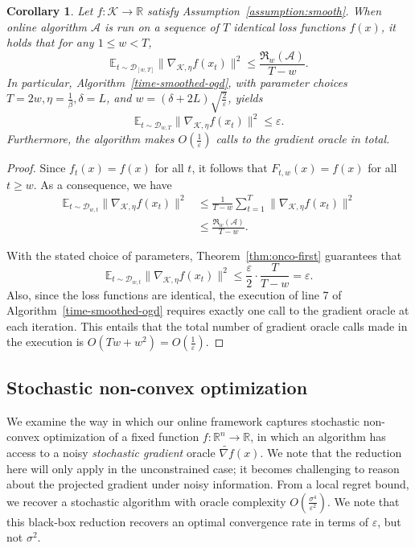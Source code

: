 \documentclass{article}
\def\reals{{\mathbb R}}
\def\reals{{\mathbb R}}
\newcommand{\K}{\ensuremath{\mathcal K}}
\def\eps{\varepsilon}
\newcommand{\pa}[1]{\left(#1\right)}
\newtheorem{corollary}[theorem]{Corollary}
\renewcommand{\K}{\mathcal{K}}
\newcommand{\Acal}{\mathcal{A}}
\newcommand{\regret}{\mathfrak{R}}
\begin{document}
\begin{corollary}
Let $f:\K\to\reals$ satisfy Assumption~\ref{assumption:smooth}. When online algorithm $\Acal$ is run on a sequence of $T$ identical loss functions $f(x)$, it holds that for any $1 \leq w < T$,
\begin{equation*}
\mathbb{E}_{t\sim \mathcal{D}_{[w,T]}} \|\nabla_{\K,\eta} f(x_t)\|^2  \leq  \frac{\regret_w(\Acal)}{T-w}.
\end{equation*}
In particular, Algorithm~\ref{time-smoothed-ogd}, with parameter choices $T=2w, \eta = \frac{1}{\beta}, \delta = L$, and $w=(\delta+2L)\sqrt{\frac{2}{\eps}}$, yields
\[ \mathbb{E}_{t\sim\mathcal{D}_{w,T}}\|\nabla_{\K,\eta} f(x_t)\|^2 \leq \eps.\]
Furthermore, the algorithm makes $O\left(\frac{1}{\eps}\right)$ calls to the gradient oracle in total.
\end{corollary}
\begin{proof}
Since $f_t(x) = f(x)$ for all $t$, it follows that $F_{t,w}(x)=f(x)$ for all $t \geq w$. As a consequence, we have
\begin{align*}
\mathbb{E}_{t\sim \mathcal{D}_{w,t}} \|\nabla_{\K,\eta} f(x_t)\|^2   &\leq \frac{1}{T-w} \sum_{t=1}^T \|\nabla_{\K,\eta} f(x_t)\|^2 \\
&\leq \frac{\regret_w(\Acal)}{T-w}.
\end{align*}

With the stated choice of parameters, Theorem~\ref{thm:onco-first} guarantees that
\[\mathbb{E}_{t\sim \mathcal{D}_{w,t}} \|\nabla_{\K,\eta} f(x_t)\|^2 \leq \frac{\eps}{2} \cdot \frac{T}{T-w} = \eps.\]
Also, since the loss functions are identical, the execution of line 7 of Algorithm~\ref{time-smoothed-ogd} requires exactly one call to the gradient oracle at each iteration. This entails that the total number of gradient oracle calls made in the execution is $O(Tw+w^2) = O(\frac{1}{\eps})$.
\end{proof}

\subsection{Stochastic non-convex optimization}
\label{stochastic-section}
We examine the way in which our online framework captures stochastic non-convex optimization of a fixed function
$f:\reals^n\to\reals$, in which an algorithm has access to a noisy \emph{stochastic gradient} oracle $\widetilde{\nabla f}(x)$. We note that the reduction here will only apply in the unconstrained case; it becomes challenging to reason about the projected gradient under noisy information. From a local regret bound, we recover a stochastic algorithm with oracle complexity $O\pa{ \frac{\sigma^4}{\eps^2} }$. We note that this black-box reduction recovers an optimal convergence rate in terms of $\eps$, but not $\sigma^2$.
\end{document}
